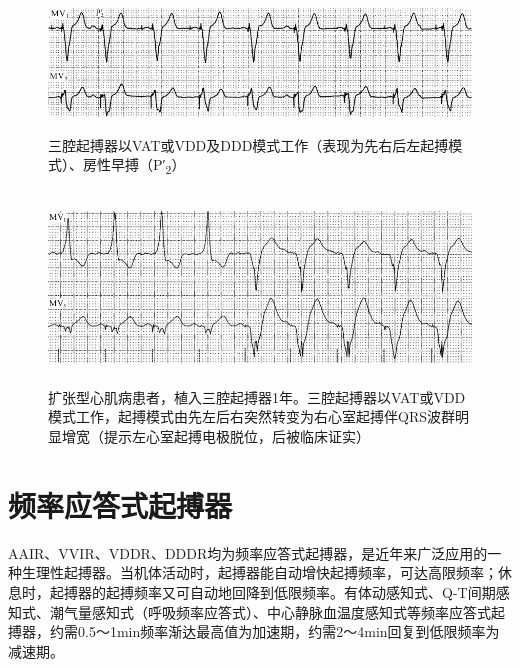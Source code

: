 \begin{figure}[!htbp]
 \centering
 \includegraphics[width=5.58333in,height=1.42708in]{./images/Image00641.jpg}
 \captionsetup{justification=centering}
 \caption{三腔起搏器以VAT或VDD及DDD模式工作（表现为先右后左起搏模式）、房性早搏（P′\textsubscript{2}）}
 \label{fig38-38}
  \end{figure} 


\begin{figure}[!htbp]
 \centering
 \includegraphics[width=5.58333in,height=2in]{./images/Image00642.jpg}
 \captionsetup{justification=centering}
 \caption{扩张型心肌病患者，植入三腔起搏器1年。三腔起搏器以VAT或VDD模式工作，起搏模式由先左后右突然转变为右心室起搏伴QRS波群明显增宽（提示左心室起搏电极脱位，后被临床证实）}
 \label{fig38-39}
  \end{figure} 

\protect\hypertarget{text00045.htmlux5cux23subid503}{}{}

\section{频率应答式起搏器}

AAIR、VVIR、VDDR、DDDR均为频率应答式起搏器，是近年来广泛应用的一种生理性起搏器。当机体活动时，起搏器能自动增快起搏频率，可达高限频率；休息时，起搏器的起搏频率又可自动地回降到低限频率。有体动感知式、Q-T间期感知式、潮气量感知式（呼吸频率应答式）、中心静脉血温度感知式等频率应答式起搏器，约需0.5～1min频率渐达最高值为加速期，约需2～4min回复到低限频率为减速期。

\protect\hypertarget{text00045.htmlux5cux23subid504}{}{}


